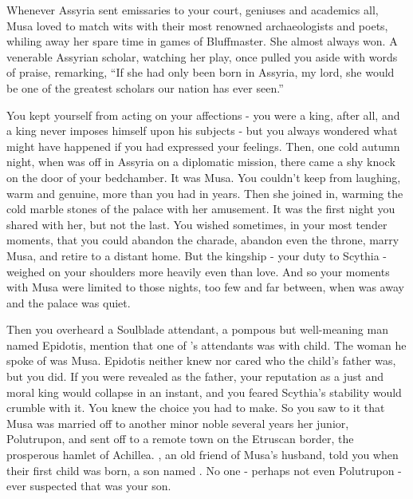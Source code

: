 \documentclass[char]{Kos}
\begin{document}
Whenever Assyria sent emissaries to your court, geniuses and academics all, Musa loved to match wits with their most renowned archaeologists and poets, whiling away her spare time in games of Bluffmaster. She almost always won. A venerable Assyrian scholar, watching her play, once pulled you aside with words of praise, remarking, ``If she had only been born in Assyria, my lord, she would be one of the greatest scholars our nation has ever seen.''

You kept yourself from acting on your affections - you were a king, after all, and a king never imposes himself upon his subjects - but you always wondered what might have happened if you had expressed your feelings. Then, one cold autumn night, when \cScythiaQueen{} was off in Assyria on a diplomatic mission, there came a shy knock on the door of your bedchamber. It was Musa. You couldn't keep from laughing, warm and genuine, more than you had in years. Then she joined in, warming the cold marble stones of the palace with her amusement. It was the first night you shared with her, but not the last. You wished sometimes, in your most tender moments, that you could abandon the charade, abandon even the throne, marry Musa, and retire to a distant home. But the kingship - your duty to Scythia - weighed on your shoulders more heavily even than love. And so your moments with Musa were limited to those nights, too few and far between, when \cScythiaQueen{} was away and the palace was quiet.

Then you overheard a Soulblade attendant, a pompous but well-meaning man named Epidotis, mention that one of \cScythiaQueen{}'s attendants was with child. The woman he spoke of was Musa. Epidotis neither knew nor cared who the child's father was, but you did. If you were revealed as the father, your reputation as a just and moral king would collapse in an instant, and you feared Scythia's stability would crumble with it. You knew the choice you had to make. So you saw to it that Musa was married off to another minor noble several years her junior, Polutrupon, and sent off to a remote town on the Etruscan border, the prosperous hamlet of Achillea. \cScythiaQueen{}, an old friend of Musa's husband, told you when their first child was born, a son named \cWard{}. No one - perhaps not even Polutrupon - ever suspected that \cWard{} was your son.
\end{document}
